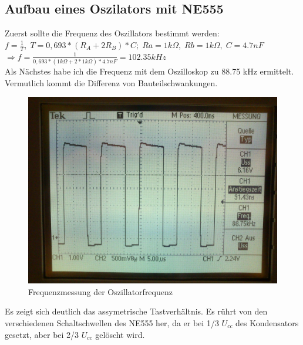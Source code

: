 \subsection{Aufbau eines Oszilators mit NE555}
Zuerst sollte die Frequenz des Oszillators bestimmt werden:\\
$ f=\frac{1}{T},\; T = 0,693 * (R_A + 2 R_B) * C;\; Ra = 1kΩ,\; Rb = 1kΩ,\; C = 4.7nF$\\
$\Rightarrow f=\frac{1}{0,693 * (1kΩ + 2*1kΩ) * 4.7nF} = 102.35 kHz$\\
Als Nächstes habe ich die Frequenz mit dem Oszilloskop zu 88.75 kHz ermittelt. Vermutlich kommt die Differenz von Bauteilschwankungen.
\begin{figure}[H]
	\centering
	\includegraphics[width=\linewidth]{versuch3/oszi/DSC_0259.JPG}
	\caption{Frequenzmessung der Oszillatorfrequenz}
\end{figure}
Es zeigt sich deutlich das assymetrische Tastverhältnis. Es rührt von den verschiedenen Schaltschwellen des NE555 her, da er bei 1/3 $ U_{cc} $ des Kondensators gesetzt, aber bei 2/3 $ U_{cc} $ gelöscht wird.


